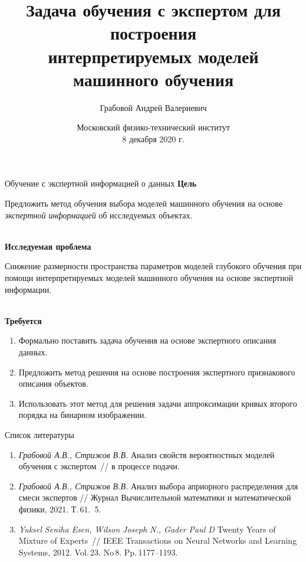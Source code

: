 \documentclass[10pt,pdf,hyperref={unicode}]{beamer}
\title[\hbox to 56mm{Обучение с экспетом\hfill\insertframenumber\,/\,\inserttotalframenumber}]
{Задача обучения с экспертом для построения\\ интерпретируемых моделей машинного обучения}
\author[А.\,В.\;Грабовой]{\large Грабовой Андрей Валериевич}
\institute[]{Кафедра интеллектуального анализа данных\\Научный руководитель: д.ф.-м.н. В.\,В.\;Стрижов\\}
\date[2020]{Московский физико-технический институт\\8 декабря 2020 г.}
\begin{document}
\begin{frame}
\titlepage
\end{frame}

\begin{frame}{Обучение с экспертной информацией о данных}
\justifying
\textbf{Цель}

Предложить метод обучения выбора моделей машинного обучения на основе \textit{экспертной информацией} об исследуемых объектах.

~\\
\textbf{Исследуемая проблема}

Снижение размерности пространства параметров моделей глубокого обучения при помощи интерпретируемых моделей машинного обучения на основе экспертной информации.

~\\
\textbf{Требуется}

\begin{enumerate}
\justifying
	\item Формально поставить задача обучения на основе экспертного описания данных.
	\item Предложить метод решения на основе построения экспертного признакового описания объектов. 
	\item Использовать этот метод для решения задачи аппроксимации кривых второго порядка на бинарном изображении.
\end{enumerate}

\end{frame}

\begin{frame}{Список литературы}
\justifying
\begin{enumerate}
	\item \textit{Грабовой А.В., Стрижов В.В.} Анализ свойств вероятностных моделей обучения с экспертом~// в процессе подачи.
	\item \textit{Грабовой А.В., Стрижов В.В.} Анализ выбора априорного распределения для смеси экспертов // Журнал Вычислительной математики и математической физики, 2021. Т.\,61. \textnumero\,5.
	\item \textit{Yuksel Seniha Esen, Wilson Joseph N., Gader Paul D} Twenty Years of Mixture of Experts~// IEEE Transactions on Neural Networks and Learning Systems, 2012. Vol.\,23. No\,8. Pp.\,1177--1193.
\end{enumerate}
\end{frame}
\end{document}
